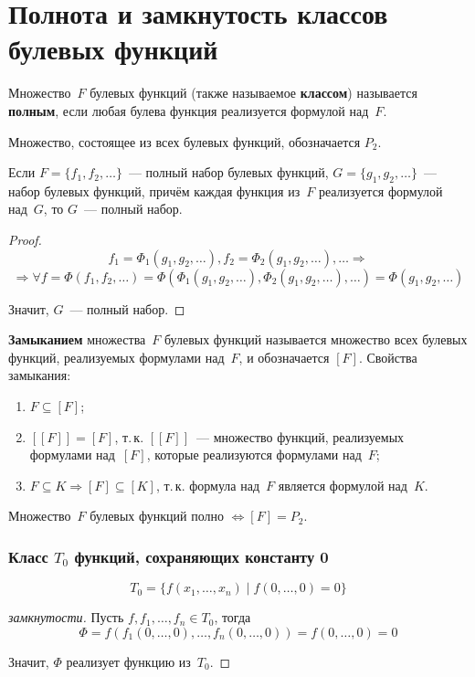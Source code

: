 \section{Полнота и замкнутость классов булевых функций}
Множество~$F$ булевых функций (также называемое \textbf{классом}) называется \textbf{полным}, если любая булева функция реализуется формулой над~$F$.

Множество, состоящее из всех булевых функций, обозначается $P_2$.

\begin{theorem}
Если $F = \{ f_1, f_2, \ldots \}$~--- полный набор булевых функций, $G = \{ g_1, g_2, \ldots \}$~--- набор булевых функций, причём каждая функция из~$F$ реализуется формулой над~$G$, то $G$~--- полный набор.
\end{theorem}
\begin{proof}
\begin{equation*}
f_1 = \Phi_1(g_1, g_2, \ldots), f_2 = \Phi_2(g_1, g_2, \ldots), \ldots \Rightarrow
\end{equation*}
\begin{equation*}
\Rightarrow \forall f = \Phi(f_1, f_2, \ldots) =
\Phi(\Phi_1(g_1, g_2, \ldots), \Phi_2(g_1, g_2, \ldots), \ldots) =
\Phi(g_1, g_2, \ldots)
\end{equation*}

Значит, $G$~--- полный набор.
\end{proof}

 \textbf{Замыканием} множества~$F$ булевых функций называется множество всех булевых функций, реализуемых формулами над~$F$, и обозначается $[F]$.
Свойства замыкания:
\begin{enumerate}
	\item $F \subseteq [F]$;
	\item $[[F]] = [F]$, т.\,к. $[[F]]$~--- множество функций, реализуемых формулами над~$[F]$, которые реализуются формулами над~$F$;
	\item $F \subseteq K \Rightarrow [F] \subseteq [K]$, т.\,к. формула над~$F$ является формулой над~$K$.
\end{enumerate}

\begin{statement}
Множество~$F$ булевых функций полно $\Leftrightarrow [F] = P_2$.
\end{statement}

\subsubsection{Класс \texorpdfstring{$T_0$}{} функций, сохраняющих константу 0}
\begin{equation*}
T_0 = \{ f(x_1, \ldots, x_n) \mid f(0, \ldots, 0) = 0 \}
\end{equation*}
\begin{proof}[замкнутости]
Пусть $f, f_1, \ldots, f_n \in T_0$, тогда
\begin{equation*}
\Phi =
f(f_1(0, \ldots, 0), \ldots, f_n(0, \ldots, 0)) =
f(0, \ldots, 0) = 0
\end{equation*}

Значит, $\Phi$ реализует функцию из~$T_0$.
\end{proof}

